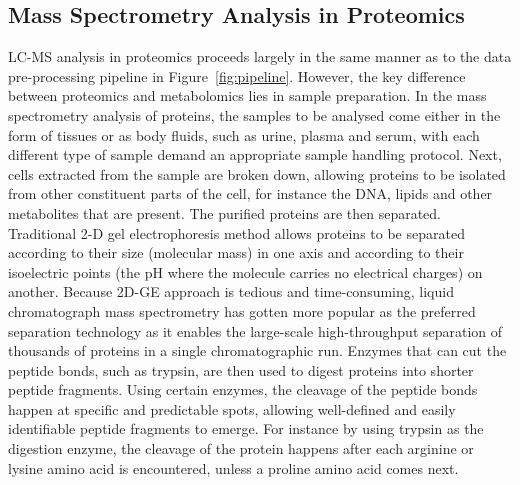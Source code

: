 
\subsection{Mass Spectrometry Analysis in Proteomics}

LC-MS analysis in proteomics proceeds largely in the same manner as to the data pre-processing pipeline in Figure~\ref{fig:pipeline}. However, the key difference between proteomics and metabolomics lies in sample preparation. In the mass spectrometry analysis of proteins, the samples to be analysed come either in the form of tissues or as body fluids, such as urine, plasma and serum, with each different type of sample demand an appropriate sample handling protocol. Next, cells extracted from the sample are broken down, allowing proteins to be isolated from other constituent parts of the cell, for instance the DNA, lipids and other metabolites that are present. The purified proteins are then separated. Traditional 2-D gel electrophoresis method allows proteins to be separated according to their size (molecular mass) in one axis and according to their isoelectric points (the pH where the molecule carries no electrical charges) on another. Because 2D-GE approach is tedious and time-consuming, liquid chromatograph mass spectrometry has gotten more popular as the preferred separation technology as it enables the large-scale high-throughput separation of thousands of proteins in a single chromatographic run. Enzymes that can cut the peptide bonds, such as trypsin, are then used to digest proteins into shorter peptide fragments. Using certain enzymes, the cleavage of the peptide bonds happen at specific and predictable spots, allowing well-defined and easily identifiable peptide fragments to emerge. For instance by using trypsin as the digestion enzyme, the cleavage of the protein happens after each arginine or lysine amino acid is encountered, unless a proline amino acid comes next. 

